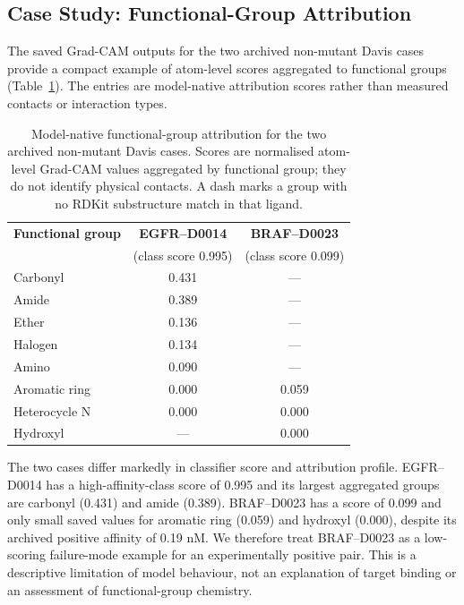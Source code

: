 \documentclass[fleqn,10pt]{wlscirep}
\begin{document}
\subsection{Case Study: Functional-Group Attribution}

The saved Grad-CAM outputs for the two archived non-mutant Davis cases provide a
compact example of atom-level scores aggregated to functional groups
(Table~\ref{tab:functional_group}).  The entries are model-native attribution
scores rather than measured contacts or interaction types.

\begin{table}[htbp]
\centering
\caption{Model-native functional-group attribution for the two archived
  non-mutant Davis cases. Scores are normalised atom-level Grad-CAM values
  aggregated by functional group; they do not identify physical contacts. A
  dash marks a group with no RDKit substructure match in that ligand.}
\label{tab:functional_group}
\begin{tabular}{lcc}
\toprule
\textbf{Functional group} & \textbf{EGFR--D0014} & \textbf{BRAF--D0023} \\
 & (class score 0.995) & (class score 0.099) \\
\midrule
Carbonyl      & 0.431 & --- \\
Amide         & 0.389 & --- \\
Ether         & 0.136 & --- \\
Halogen       & 0.134 & --- \\
Amino         & 0.090 & --- \\
Aromatic ring & 0.000 & 0.059 \\
Heterocycle N & 0.000 & 0.000 \\
Hydroxyl      & ---   & 0.000 \\
\bottomrule
\end{tabular}
\end{table}

\FloatBarrier

The two cases differ markedly in classifier score and attribution profile.
EGFR--D0014 has a high-affinity-class score of 0.995 and its largest aggregated
groups are carbonyl (0.431) and amide (0.389).  BRAF--D0023 has a score of 0.099
and only small saved values for aromatic ring (0.059) and hydroxyl (0.000),
despite its archived positive affinity of 0.19 nM. We therefore treat
BRAF--D0023 as a low-scoring failure-mode example for an experimentally positive
pair. This is a descriptive limitation of model behaviour, not an explanation of
target binding or an assessment of functional-group chemistry.
\end{document}
